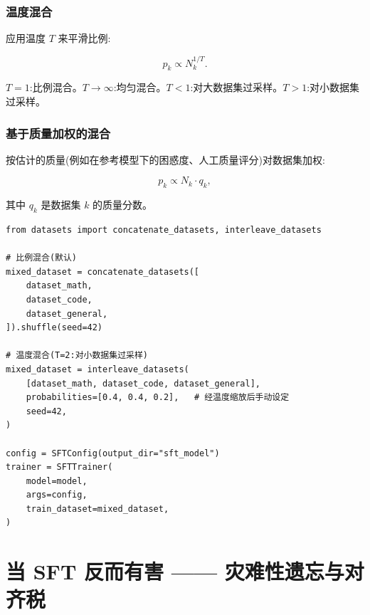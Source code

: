 \subsubsection*{温度混合}
\label{temperature-mixing}

应用温度 $T$ 来平滑比例:

\[
p_k \propto N_k^{1/T}.
\]

$T=1$:比例混合。$T \to \infty$:均匀混合。$T < 1$:对大数据集过采样。$T > 1$:对小数据集过采样。

\subsubsection*{基于质量加权的混合}
\label{quality-weighted-mixing}

按估计的质量(例如在参考模型下的困惑度、人工质量评分)对数据集加权:

\[
p_k \propto N_k \cdot q_k,
\]

其中 $q_k$ 是数据集 $k$ 的质量分数。

\begin{examplebox}
\begin{lstlisting}[style=pythonstyle]
from datasets import concatenate_datasets, interleave_datasets

# 比例混合(默认)
mixed_dataset = concatenate_datasets([
    dataset_math,
    dataset_code,
    dataset_general,
]).shuffle(seed=42)

# 温度混合(T=2:对小数据集过采样)
mixed_dataset = interleave_datasets(
    [dataset_math, dataset_code, dataset_general],
    probabilities=[0.4, 0.4, 0.2],   # 经温度缩放后手动设定
    seed=42,
)

config = SFTConfig(output_dir="sft_model")
trainer = SFTTrainer(
    model=model,
    args=config,
    train_dataset=mixed_dataset,
)
\end{lstlisting}
\end{examplebox}

\section{当 SFT 反而有害 —— 灾难性遗忘与对齐税}
\label{sec:sft-pitfalls}

